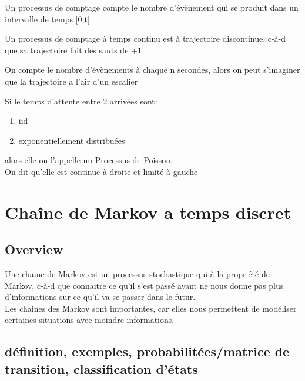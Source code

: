 \documentclass{article}
\begin{document}
\begin{definition}
    Un processus de comptage compte le nombre d'évènement qui se produit
    dans un intervalle de temps [0,t]
\end{definition}

\begin{remark}
    Un processus de comptage à temps continu est à trajectoire discontinue,
    c-à-d que sa trajectoire fait des sauts de +1
\end{remark}

\begin{intuition}
    On compte le nombre d'évènements à chaque n secondes, alors on peut
    s'imaginer que la trajectoire a l'air d'un escalier
\end{intuition}

\begin{definition}
    Si le temps d'attente entre 2 arrivées sont:
    \begin{enumerate}
	\item iid
	\item exponentiellement distribuées
    \end{enumerate}
    alors elle on l'appelle un Processus de Poisson.\\
    On dit qu'elle est continue à droite et limité à gauche
\end{definition}

\section{Chaîne de Markov a temps discret}

\subsection{Overview}

Une chaine de Markov est un processus stochastique qui à la propriété de
Markov, c-à-d que connaitre ce qu'il s'est passé avant ne nous donne pas
plus d'informations sur ce qu'il va se passer dans le futur.\\

Les chaines des Markov sont importantes, car elles nous permettent de
modéliser certaines situations avec moindre informations.

\subsection{définition, exemples, probabilitées/matrice de transition, classification d’états}
\end{document}
